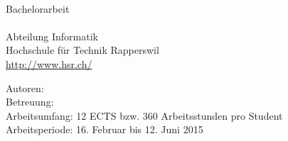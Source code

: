 \begin{titlepage}
\begin{flushleft}
{\huge \bfseries \TITLE}\\[2.5cm]

Bachelorarbeit \\
\SEMESTER \\
Abteilung Informatik \\
Hochschule für Technik Rapperswil \\
\url{http://www.hsr.ch/}\\[2cm]


\vfill

Autoren: \AUTHOR \\
Betreuung: \SUPERVISOR \\
Arbeitsumfang: 12 ECTS bzw. 360 Arbeitsstunden pro Student \\
Arbeitsperiode: 16. Februar bis 12. Juni 2015 \\

\end{flushleft}
\end{titlepage}
